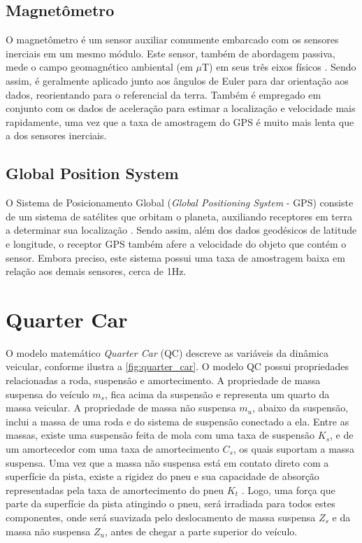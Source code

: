 \subsection{Magnetômetro}

O magnetômetro é um sensor auxiliar comumente embarcado com os sensores inerciais em um mesmo módulo. Este sensor, também de abordagem passiva, mede o campo geomagnético ambiental (em $\mu$T) em seus três eixos físicos \cite{Sattar2018}. Sendo assim, é geralmente aplicado junto aos ângulos de Euler para dar orientação aos dados, reorientando para o referencial da terra. Também é empregado em conjunto com os dados de aceleração para estimar a localização e velocidade mais rapidamente, uma vez que a taxa de amostragem do GPS é muito mais lenta que a dos sensores inerciais.

\subsection{Global Position System}

O Sistema de Posicionamento Global (\textit{Global Positioning System} - GPS) consiste de um sistema de satélites que orbitam o planeta, auxiliando receptores em terra a determinar sua localização \cite{Milette2012}. Sendo assim, além dos dados geodésicos de latitude e longitude, o receptor GPS também afere a velocidade do objeto que contém o sensor. Embora preciso, este sistema possui uma taxa de amostragem baixa em relação aos demais sensores, cerca de 1Hz.

\section{Quarter Car}

O modelo matemático \textit{Quarter Car} (QC) descreve as variáveis da dinâmica veicular, conforme ilustra a \autoref{fig:quarter_car}. O modelo QC possui propriedades relacionadas a roda, suspensão e amortecimento. A propriedade de massa suspensa do veículo $m_s$, fica acima da suspensão e representa um quarto da massa veicular. A propriedade de massa não suspensa $m_u$, abaixo da suspensão, inclui a massa de uma roda e do sistema de suspensão conectado a ela. Entre as massas, existe uma suspensão feita de mola com uma taxa de suspensão $K_s$, e de um amortecedor com uma taxa de amortecimento $C_s$, os quais suportam a massa suspensa. Uma vez que a massa não suspensa está em contato direto com a superfície da pista, existe a rigidez do pneu e sua  capacidade de absorção representadas pela taxa de amortecimento do pneu $K_t$ \cite{Yafeai2019,Loizos2008}. Logo, uma força que parte da superfície da pista atingindo o pneu, será irradiada para todos estes componentes, onde será suavizada pelo deslocamento de massa suspensa $Z_s$ e da massa não suspensa $Z_u$, antes de chegar a parte superior do veículo.

